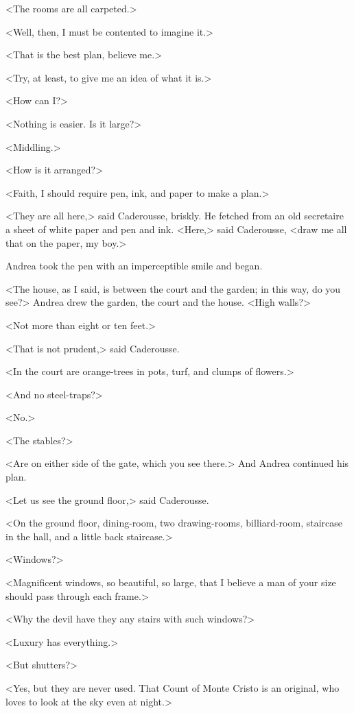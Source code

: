  <The rooms are all carpeted.> 

 <Well, then, I must be contented to imagine it.> 

 <That is the best plan, believe me.> 

 <Try, at least, to give me an idea of what it is.> 

 <How can I?> 

 <Nothing is easier. Is it large?> 

 <Middling.> 

 <How is it arranged?> 

 <Faith, I should require pen, ink, and paper to make a plan.> 

 <They are all here,> said Caderousse, briskly. He fetched from an old secretaire a sheet of white paper and pen and ink. <Here,> said Caderousse, <draw me all that on the paper, my boy.> 

 Andrea took the pen with an imperceptible smile and began. 

 <The house, as I said, is between the court and the garden; in this way, do you see?> Andrea drew the garden, the court and the house.  <High walls?> 

 <Not more than eight or ten feet.> 

 <That is not prudent,> said Caderousse. 

 <In the court are orange-trees in pots, turf, and clumps of flowers.> 

 <And no steel-traps?> 

 <No.> 

 <The stables?> 

 <Are on either side of the gate, which you see there.> And Andrea continued his plan. 

 <Let us see the ground floor,> said Caderousse. 

 <On the ground floor, dining-room, two drawing-rooms, billiard-room, staircase in the hall, and a little back staircase.> 

 <Windows?> 

 <Magnificent windows, so beautiful, so large, that I believe a man of your size should pass through each frame.> 

 <Why the devil have they any stairs with such windows?> 

 <Luxury has everything.> 

 <But shutters?> 

 <Yes, but they are never used. That Count of Monte Cristo is an original, who loves to look at the sky even at night.> 

